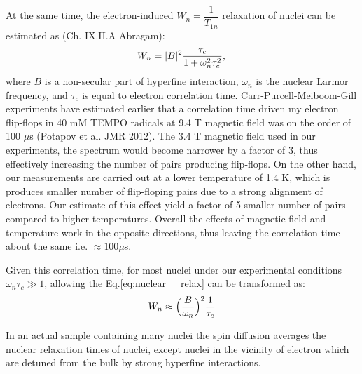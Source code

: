 \documentclass[a4paper, 12pt]{article}
\begin{document}
At the same time, the electron-induced $W_n = \dfrac{1}{T_{1n}}$ relaxation of  nuclei can be estimated as (Ch. IX.II.A Abragam):
\begin{equation}\label{eq:nuclear__relax}
W_{n} =    \vert B \vert ^2 \dfrac{\tau_c}{1+\omega_n^2\tau_c^2},  \\
\end{equation}
where $B$ is a non-secular part of hyperfine interaction, $\omega_n$ is the nuclear Larmor frequency, and $\tau_c$ is equal to electron correlation time.  Carr-Purcell-Meiboom-Gill experiments have estimated earlier that a correlation time driven my electron flip-flops in 40 mM TEMPO radicals at 9.4 T magnetic field was on the order of 100 $\mu$s (Potapov et al. JMR 2012). The 3.4 T magnetic field used in our experiments, the spectrum would become narrower by a factor of 3, thus effectively increasing the number of pairs producing flip-flops. On the other hand, our measurements are carried out at a lower temperature of 1.4 K, which is produces smaller number of flip-floping pairs due to a strong alignment of electrons. Our estimate of this effect yield a factor of 5 smaller number of pairs compared to higher temperatures. Overall the effects of magnetic field and temperature work in the opposite directions, thus leaving the correlation time about the same i.e. $\approx 100 \mu$s. 

 Given this correlation time, for most nuclei under our experimental conditions $\omega_n \tau_c \gg 1$, allowing the Eq.\ref*{eq:nuclear__relax} can be transformed as:
\begin{equation}
W_{n} \approx    \Big( \dfrac{B}{\omega_n} \Big) ^2 \dfrac{1}{\tau_c}  \\
\end{equation}

 In an actual sample containing many nuclei the spin diffusion averages the nuclear relaxation times of nuclei, except nuclei in the vicinity of electron which are detuned from the bulk by strong hyperfine interactions.
\end{document}
